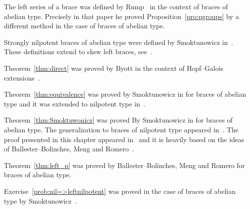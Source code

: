 The left series of a brace was defined by Rump~\cite{MR2278047} in the context of 
braces of abelian type. Precisely in that paper he proved 
Proposition~\ref{pro:pgroups} by a different method 
in the case of braces of abelian type. 

Strongly nilpotent braces of abelian type were defined by Smoktunowicz in~\cite{MR3814340}.
These definitions extend to skew left braces, see~\cite{MR3957824}.  

Theorem~\ref{thm:direct} was proved by Byott in the context of Hopf--Galois extensions~\cite{MR3030514}. 

Theorem~\ref{thm:equivalence} was proved by Smoktunowicz in \cite{MR3814340} for braces of abelian type and it was extended 
to nilpotent type in~\cite{MR3957824}. 

Theorem~\ref{thm:Smoktuwonicz} was proved By Smoktunowicz in \cite[Theorem 1.1]{MR3814340} for braces of abelian type. 
The generalization to braces of nilpotent type appeared in~\cite[Theorem 4.8]{MR3957824}. The proof 
presented in this chapter appeared in~\cite{MR4062375} and it is 
heavily based on the ideas of Ballester--Bolinches, Meng and Romero~\cite{MR3935814}.

Theorem~\ref{thm:left_p} was proved by Ballester--Bolinches, Meng and Romero for braces of abelian type.

Exercise~\ref{prob:nil=>leftnilpotent} was proved in the case of braces of abelian type by Smoktunowicz~\cite{MR3765444}.